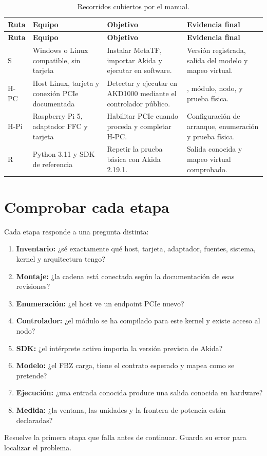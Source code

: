 \begin{longtable}{@{}L{0.12\textwidth}L{0.21\textwidth}L{0.29\textwidth}L{0.28\textwidth}@{}}
\caption{Recorridos cubiertos por el manual.}\label{tab:rutas}\\
\toprule
\textbf{Ruta} & \textbf{Equipo} & \textbf{Objetivo} & \textbf{Evidencia final} \\
\midrule
\endfirsthead
\toprule
\textbf{Ruta} & \textbf{Equipo} & \textbf{Objetivo} & \textbf{Evidencia final} \\
\midrule
\endhead
S & Windows o Linux compatible, sin tarjeta & Instalar MetaTF, importar Akida y ejecutar en software. & Versión registrada, salida del modelo y mapeo virtual. \\
H-PC & Host Linux, tarjeta y conexión PCIe documentada & Detectar y ejecutar en AKD1000 mediante el controlador público. & , módulo, nodo,  y prueba física. \\
H-Pi & Raspberry Pi 5, adaptador FFC y tarjeta & Habilitar PCIe cuando proceda y completar H-PC. & Configuración de arranque, enumeración y prueba física. \\
R & Python 3.11 y SDK de referencia & Repetir la prueba básica con Akida 2.19.1. & Salida conocida y mapeo virtual comprobado. \\
\bottomrule
\end{longtable}

\section{Comprobar cada etapa}

Cada etapa responde a una pregunta distinta:

\begin{enumerate}[nosep]
  \item \textbf{Inventario:} ¿sé exactamente qué host, tarjeta, adaptador, fuentes, sistema,
        kernel y arquitectura tengo?
  \item \textbf{Montaje:} ¿la cadena está conectada según la documentación de esas revisiones?
  \item \textbf{Enumeración:} ¿el host ve un endpoint PCIe nuevo?
  \item \textbf{Controlador:} ¿el módulo se ha compilado para este kernel y existe acceso al nodo?
  \item \textbf{SDK:} ¿el intérprete activo importa la versión prevista de Akida?
  \item \textbf{Modelo:} ¿el FBZ carga, tiene el contrato esperado y mapea como se pretende?
  \item \textbf{Ejecución:} ¿una entrada conocida produce una salida conocida en hardware?
  \item \textbf{Medida:} ¿la ventana, las unidades y la frontera de potencia están declaradas?
\end{enumerate}

Resuelve la primera etapa que falla antes de continuar. Guarda su error para localizar
el problema.
